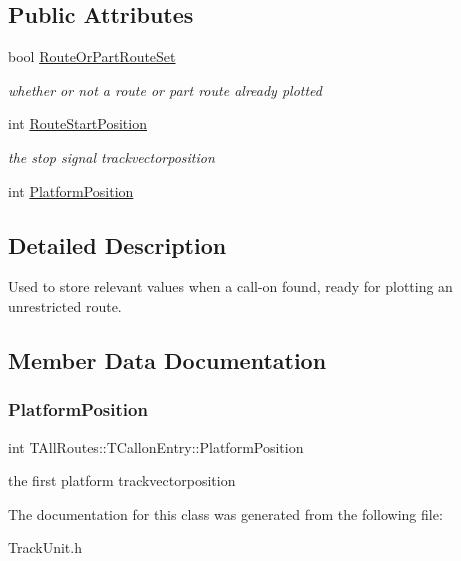 \subsection*{Public Attributes}
\begin{DoxyCompactItemize}
\item 
\mbox{\label{class_t_all_routes_1_1_t_callon_entry_aa6c0e221fef9538d988ddd6565af7fcb}} 
bool \mbox{\hyperlink{class_t_all_routes_1_1_t_callon_entry_aa6c0e221fef9538d988ddd6565af7fcb}{Route\+Or\+Part\+Route\+Set}}
\begin{DoxyCompactList}\small\item\em whether or not a route or part route already plotted \end{DoxyCompactList}\item 
\mbox{\label{class_t_all_routes_1_1_t_callon_entry_aeb47ca8fe4ce0ca46e07c35f2d353596}} 
int \mbox{\hyperlink{class_t_all_routes_1_1_t_callon_entry_aeb47ca8fe4ce0ca46e07c35f2d353596}{Route\+Start\+Position}}
\begin{DoxyCompactList}\small\item\em the stop signal trackvectorposition \end{DoxyCompactList}\item 
int \mbox{\hyperlink{class_t_all_routes_1_1_t_callon_entry_a538fe345a1cd31068c96302ef0055bd3}{Platform\+Position}}
\end{DoxyCompactItemize}


\subsection{Detailed Description}
Used to store relevant values when a call-\/on found, ready for plotting an unrestricted route. 

\subsection{Member Data Documentation}
\mbox{\label{class_t_all_routes_1_1_t_callon_entry_a538fe345a1cd31068c96302ef0055bd3}} 
\subsubsection{\texorpdfstring{Platform\+Position}{PlatformPosition}}
{\footnotesize\ttfamily int T\+All\+Routes\+::\+T\+Callon\+Entry\+::\+Platform\+Position}

the first platform trackvectorposition 

The documentation for this class was generated from the following file\+:\begin{DoxyCompactItemize}
\item 
Track\+Unit.\+h\end{DoxyCompactItemize}
